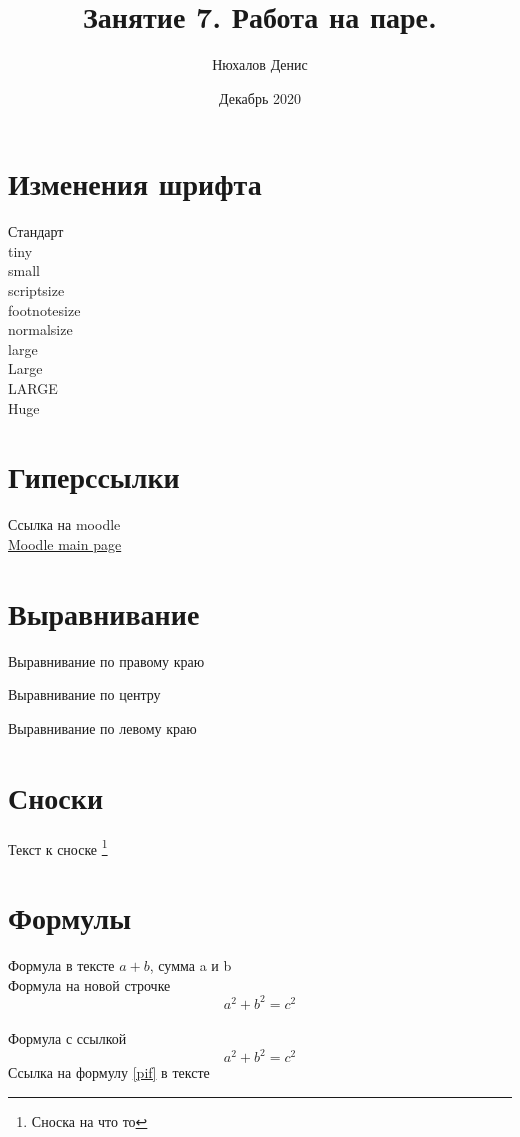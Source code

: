 \documentclass[a4paper,14pt]{article} %
\author{Нюхалов Денис}
\title{Занятие 7. Работа на паре.}
\date{Декабрь 2020}
\begin{document}
\maketitle
\newpage
\section{Изменения шрифта}


Стандарт\\
\tiny tiny\\
\small small\\
\scriptsize scriptsize\\
\footnotesize footnotesize\\
\normalsize normalsize\\
\large large\\
\Large Large\\
\LARGE LARGE\\
\huge Huge\\





\section{Гиперссылки}

Ссылка на moodle\\
\href{https://moodle.herzen.spb.ru/}{Moodle main page}

\section{Выравнивание}

\begin{flushright}
Выравнивание по правому краю
\end{flushright}

\begin{center}
Выравнивание по центру
\end{center}

\begin{flushleft}
Выравнивание по левому краю
\end{flushleft}

\section{Сноски}
Текст к сноске
\footnote{Сноска на что то}

\section{Формулы}
Формула в тексте $a+b$, сумма a и b\\
Формула на новой строчке $$a^2 + b^2 = c^2$$\\
Формула с ссылкой\\
\begin{equation}
    \label{pif}
    a^2 + b^2 = c^2
\end{equation}
Ссылка на формулу \eqref{pif} в тексте\\
\end{document}
